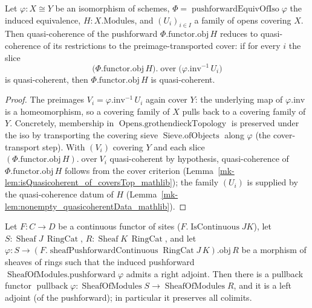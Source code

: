 \begin{lemma}
  \label{mk-lem:pushforward_iso_qcoh_of_slice_qcoh}

  Let \(\varphi : X \cong Y\) be an isomorphism of schemes,
  \(\Phi = \operatorname{pushforwardEquivOfIso}\varphi\) the induced equivalence, \(H :
  X.\mathrm{Modules}\), and \((U_i)_{i \in I}\) a family of opens covering \(X\). Then quasi-coherence
  of the pushforward \(\Phi.\mathrm{functor}.\mathrm{obj}\, H\) reduces to quasi-coherence of its
  restrictions to the preimage-transported cover: if for every \(i\) the slice
  \[
    \bigl(\Phi.\mathrm{functor}.\mathrm{obj}\, H\bigr).\operatorname{over}
      \bigl(\varphi.\mathrm{inv}^{-1}\,U_i\bigr)
  \]
  is quasi-coherent, then \(\Phi.\mathrm{functor}.\mathrm{obj}\, H\) is quasi-coherent.
\end{lemma}
\begin{proof}
  The preimages \(V_i = \varphi.\mathrm{inv}^{-1}\,U_i\) again cover \(Y\): the underlying map of
  \(\varphi.\mathrm{inv}\) is a homeomorphism, so a covering family of \(X\) pulls back to a covering
  family of \(Y\). Concretely, membership in \(\operatorname{Opens.grothendieckTopology}\) is preserved
  under the iso by transporting the covering sieve \(\operatorname{Sieve.ofObjects}\) along
  \(\varphi\) (the cover-transport step). With \((V_i)\) covering \(Y\) and each slice
  \((\Phi.\mathrm{functor}.\mathrm{obj}\, H).\operatorname{over} V_i\) quasi-coherent by hypothesis,
  quasi-coherence of \(\Phi.\mathrm{functor}.\mathrm{obj}\, H\) follows from the cover criterion
  (Lemma~\ref{mk-lem:isQuasicoherent_of_coversTop_mathlib}); the family \((U_i)\) is supplied by the
  quasi-coherence datum of \(H\) (Lemma~\ref{mk-lem:nonempty_quasicoherentData_mathlib}).
\end{proof}

\begin{lemma}
  \label{mk-lem:sheafOfModules_pullback_mathlib}
  \mathlibok

  Let \(F : C \to D\) be a continuous functor of sites (\(F.\operatorname{IsContinuous} J K\)), let
  \(S : \operatorname{Sheaf} J\,\operatorname{RingCat}\), \(R : \operatorname{Sheaf}
  K\,\operatorname{RingCat}\), and let \(\varphi : S \to (F.\operatorname{sheafPushforwardContinuous}
  \operatorname{RingCat} J\,K).\mathrm{obj}\, R\) be a morphism of sheaves of rings such that the induced
  pushforward \(\operatorname{SheafOfModules.pushforward}\varphi\) admits a right adjoint. Then there is a
  pullback functor \(\operatorname{pullback}\varphi : \operatorname{SheafOfModules} S \to
  \operatorname{SheafOfModules} R\), and it is a left adjoint (of the pushforward); in particular it
  preserves all colimits.
\end{lemma}

